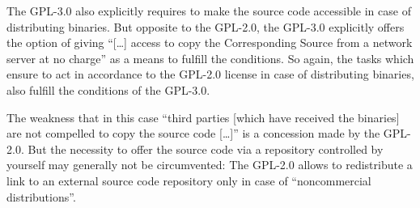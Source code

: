 \label{Gpl3CondCopyleft}
The GPL-3.0 also explicitly requires to make the source code accessible in case
of distributing binaries. But opposite to the GPL-2.0, the GPL-3.0 explicitly
offers the option of giving \enquote{[\ldots] access to copy the Corresponding
Source from a network server at no charge} as a means to fulfill the
conditions. So again, the tasks which ensure to act in
accordance to the GPL-2.0 license in case of distributing binaries, also fulfill
the conditions of the GPL-3.0.

The weakness that in this case \enquote{third parties [which have received the
binaries] are not compelled to copy the source code [\ldots]} is a concession
made by the GPL-2.0. But the necessity to offer the
source code via a repository controlled by yourself may generally not be
circumvented: The GPL-2.0 allows to redistribute a link to an external source
code repository only in case of \enquote{noncommercial
distributions}. 
  
